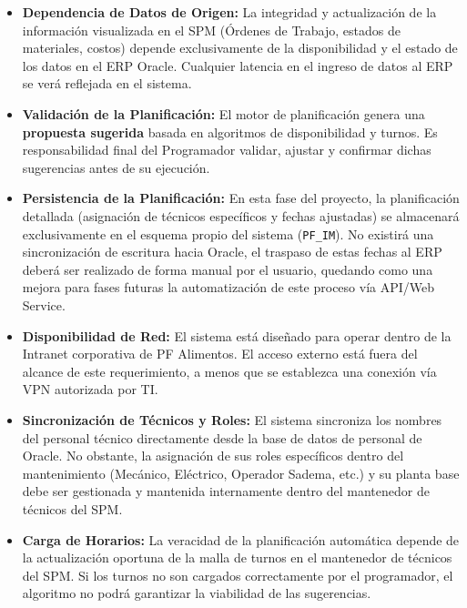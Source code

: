 \documentclass[11pt, letterpaper]{article}
\begin{document}
\begin{itemize}
    \item \textbf{Dependencia de Datos de Origen:} La integridad y actualización de la información visualizada en el SPM (Órdenes de Trabajo, estados de materiales, costos) depende exclusivamente de la disponibilidad y el estado de los datos en el ERP Oracle. Cualquier latencia en el ingreso de datos al ERP se verá reflejada en el sistema.
    
    \item \textbf{Validación de la Planificación:} El motor de planificación genera una \textbf{propuesta sugerida} basada en algoritmos de disponibilidad y turnos. Es responsabilidad final del Programador validar, ajustar y confirmar dichas sugerencias antes de su ejecución.
    
    \item \textbf{Persistencia de la Planificación:} En esta fase del proyecto, la planificación detallada (asignación de técnicos específicos y fechas ajustadas) se almacenará exclusivamente en el esquema propio del sistema (\texttt{PF\_IM}). No existirá una sincronización de escritura hacia Oracle, el traspaso de estas fechas al ERP deberá ser realizado de forma manual por el usuario, quedando como una mejora para fases futuras la automatización de este proceso vía API/Web Service.
    
    \item \textbf{Disponibilidad de Red:} El sistema está diseñado para operar dentro de la Intranet corporativa de PF Alimentos. El acceso externo está fuera del alcance de este requerimiento, a menos que se establezca una conexión vía VPN autorizada por TI.

    \item \textbf{Sincronización de Técnicos y Roles:} El sistema sincroniza los nombres del personal técnico directamente desde la base de datos de personal de Oracle. No obstante, la asignación de sus roles específicos dentro del mantenimiento (Mecánico, Eléctrico, Operador Sadema, etc.) y su planta base debe ser gestionada y mantenida internamente dentro del mantenedor de técnicos del SPM.
    
    \item \textbf{Carga de Horarios:} La veracidad de la planificación automática depende de la actualización oportuna de la malla de turnos en el mantenedor de técnicos del SPM. Si los turnos no son cargados correctamente por el programador, el algoritmo no podrá garantizar la viabilidad de las sugerencias.


\end{itemize}
\end{document}
